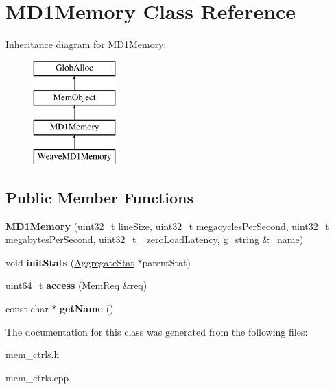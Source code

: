 \hypertarget{classMD1Memory}{\section{M\-D1\-Memory Class Reference}
\label{classMD1Memory}
}
Inheritance diagram for M\-D1\-Memory\-:\begin{figure}[H]
\begin{center}
\leavevmode
\includegraphics[height=4.000000cm]{classMD1Memory}
\end{center}
\end{figure}
\subsection*{Public Member Functions}
\begin{DoxyCompactItemize}
\item 
\hypertarget{classMD1Memory_a4664fc1ade5df44b4f6863e6f0cbf2f6}{{\bfseries M\-D1\-Memory} (uint32\-\_\-t line\-Size, uint32\-\_\-t megacycles\-Per\-Second, uint32\-\_\-t megabytes\-Per\-Second, uint32\-\_\-t \-\_\-zero\-Load\-Latency, g\-\_\-string \&\-\_\-name)}\label{classMD1Memory_a4664fc1ade5df44b4f6863e6f0cbf2f6}

\item 
\hypertarget{classMD1Memory_a657b4c85996c3ae5c88e481abc616bfe}{void {\bfseries init\-Stats} (\hyperlink{classAggregateStat}{Aggregate\-Stat} $\ast$parent\-Stat)}\label{classMD1Memory_a657b4c85996c3ae5c88e481abc616bfe}

\item 
\hypertarget{classMD1Memory_a75f00e592cf0c3feca3c01c1e9f0fd6c}{uint64\-\_\-t {\bfseries access} (\hyperlink{structMemReq}{Mem\-Req} \&req)}\label{classMD1Memory_a75f00e592cf0c3feca3c01c1e9f0fd6c}

\item 
\hypertarget{classMD1Memory_a26ccb0547e5840c22ada8b9cfc418464}{const char $\ast$ {\bfseries get\-Name} ()}\label{classMD1Memory_a26ccb0547e5840c22ada8b9cfc418464}

\end{DoxyCompactItemize}


The documentation for this class was generated from the following files\-:\begin{DoxyCompactItemize}
\item 
mem\-\_\-ctrls.\-h\item 
mem\-\_\-ctrls.\-cpp\end{DoxyCompactItemize}
